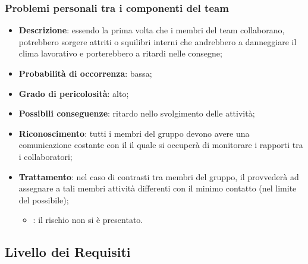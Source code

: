 \documentclass[PianoDiProgetto.tex]{subfiles}
\begin{document}
		\subsubsection{Problemi personali tra i componenti del team}
			\label{sec:pptc}
\begin{itemize}
		\item \textbf{Descrizione}: essendo la prima volta che i membri del team collaborano, potrebbero sorgere attriti o squilibri interni che andrebbero a danneggiare il clima lavorativo e porterebbero a ritardi nelle consegne;
		\item \textbf{Probabilità di occorrenza}: bassa;
		\item \textbf{Grado di pericolosità}: alto;
		\item \textbf{Possibili conseguenze}: ritardo nello svolgimento delle attività;
		\item \textbf{Riconoscimento}: tutti i membri del gruppo devono avere una comunicazione costante con il \RESP{} il quale si occuperà di monitorare i rapporti tra i collaboratori;
		\item \textbf{Trattamento}: nel caso di contrasti tra membri del gruppo, il \RESP{} provvederà ad assegnare a tali membri attività differenti con il minimo contatto (nel limite del possibile);
		\begin{itemize}
				\item \PerAR : il rischio non si è presentato.
		\end{itemize}
	\end{itemize}
	
	\subsection{Livello dei Requisiti}
\end{document}
